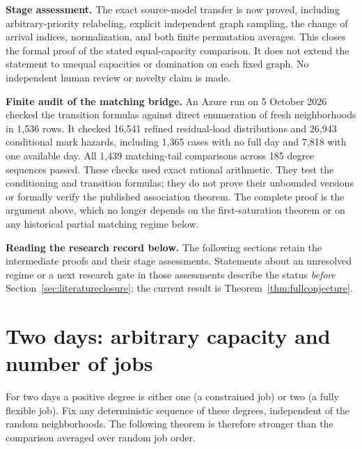 \documentclass[11pt]{article}
\begin{document}
\noindent\textbf{Stage assessment.}
The exact source-model transfer is now proved, including arbitrary-priority
relabeling, explicit independent graph sampling, the change of arrival
indices, normalization, and both finite permutation averages. This closes
the formal proof of the stated equal-capacity comparison. It does not
extend the statement to unequal capacities or domination on each fixed
graph. No independent human review or novelty claim is made.

\medskip\noindent\textbf{Finite audit of the matching bridge.}
An Azure run on 5 October 2026 checked the transition formulas against
direct enumeration of fresh neighborhoods in 1,536 rows. It checked
16,541 refined residual-load distributions and 26,943 conditional
mark hazards, including 1,365 cases with no full day and 7,818 with
one available day. All 1,439 matching-tail comparisons across 185
degree sequences passed. These checks used exact rational arithmetic.
They test the conditioning and transition formulas; they do not prove
their unbounded versions or formally verify the published association
theorem. The complete proof is the argument above, which no longer
depends on the first-saturation theorem or on any historical partial
matching regime below.

\medskip\noindent\textbf{Reading the research record below.}
The following sections retain the intermediate proofs and their stage
assessments. Statements about an unresolved regime or a next research
gate in those assessments describe the status \emph{before}
Section~\ref{sec:literatureclosure}; the current result is
Theorem~\ref{thm:fullconjecture}.

\section{Two days: arbitrary capacity and number of jobs}
For two days a positive degree is either one (a constrained job) or two
(a fully flexible job). Fix any deterministic sequence of these degrees,
independent of the random neighborhoods. The following theorem is therefore
stronger than the comparison averaged over random job order.
\end{document}
